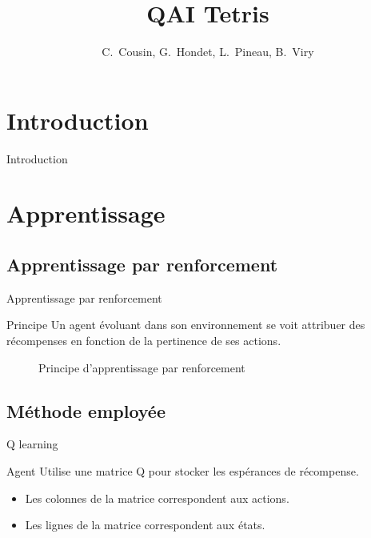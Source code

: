 \documentclass[tikz, footheight=2em]{beamer}
\title{QAI Tetris}
\author{C.~Cousin, G.~Hondet, L.~Pineau, B.~Viry}
\date{}
\begin{document}
\frame{\titlepage}


\section*{Introduction}
\begin{frame}[c]{Introduction}
\end{frame}

\section{Apprentissage}
\subsection{Apprentissage par renforcement}
\begin{frame}{Apprentissage par renforcement}
  \begin{block}{Principe}
    Un agent évoluant dans son environnement se voit attribuer des
    récompenses en fonction de la pertinence de ses actions.
    \begin{figure}[h]
      \begin{center}
      \end{center}
      \caption{Principe d'apprentissage par renforcement}
      \label{fig:reinforcement_learning}
    \end{figure}
  \end{block}
\end{frame}


\subsection{Méthode employée}

\begin{frame}{Q learning}
  \begin{block}{Agent}
    Utilise une matrice Q pour stocker les espérances de récompense.
  \end{block}
  \begin{itemize}
    \item Les colonnes de la matrice correspondent aux actions.
    \item Les lignes de la matrice correspondent aux états.
  \end{itemize}
\end{frame}
\end{document}
